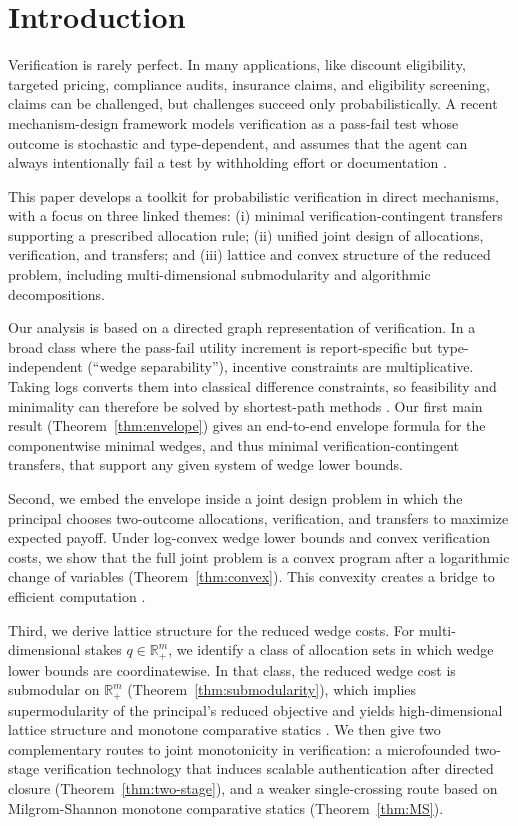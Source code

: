 \documentclass[final,3p,times]{elsarticle}
\theoremstyle{plain}
\theoremstyle{definition}
\newcommand{\R}{\mathbb{R}}
\newcommand{\1}{\mathbbm{1}}
\begin{document}
\section{Introduction}

Verification is rarely perfect. In many applications, like discount eligibility, targeted pricing, compliance audits, insurance claims, and eligibility screening, claims can be challenged, but challenges succeed only probabilistically. A recent mechanism-design framework models verification as a pass-fail test whose outcome is stochastic and type-dependent, and assumes that the agent can always intentionally fail a test by withholding effort or documentation \citep{BallKattwinkel2025}. 

This paper develops a toolkit for probabilistic verification in direct mechanisms, with a focus on three linked themes:
(i) minimal verification-contingent transfers supporting a prescribed allocation rule; 
(ii) unified joint design of allocations, verification, and transfers; and 
(iii) lattice and convex structure of the reduced problem, including multi-dimensional submodularity and algorithmic decompositions.

Our analysis is based on a directed graph representation of verification. In a broad class where the pass-fail utility increment is report-specific but type-independent (``wedge separability''), incentive constraints are multiplicative. Taking logs converts them into classical difference constraints, so feasibility and minimality can therefore be solved by shortest-path methods \citep{CLRS2009}. Our first main result (Theorem~\ref{thm:envelope}) gives an end-to-end envelope formula for the componentwise minimal wedges, and thus minimal verification-contingent transfers, that support any given system of wedge lower bounds.

Second, we embed the envelope inside a joint design problem in which the principal chooses two-outcome allocations, verification, and transfers to maximize expected payoff. Under log-convex wedge lower bounds and convex verification costs, we show that the full joint problem is a convex program after a logarithmic change of variables (Theorem~\ref{thm:convex}). This convexity creates a bridge to efficient computation \citep{BoydVandenberghe2004,BoydKimVandenbergheHassibi2007}.

Third, we derive lattice structure for the reduced wedge costs. For multi-dimensional stakes $q\in\R_+^m$, we identify a class of allocation sets in which wedge lower bounds are coordinatewise. In that class, the reduced wedge cost is submodular on $\R_+^m$ (Theorem~\ref{thm:submodularity}), which implies supermodularity of the principal's reduced objective and yields high-dimensional lattice structure and monotone comparative statics \citep{Topkis1998}. We then give two complementary routes to joint monotonicity in verification: 
a microfounded two-stage verification technology that induces scalable authentication after directed closure (Theorem~\ref{thm:two-stage}), and a weaker single-crossing route based on Milgrom-Shannon monotone comparative statics \citep{MilgromShannon1994} (Theorem~\ref{thm:MS}).
\end{document}
